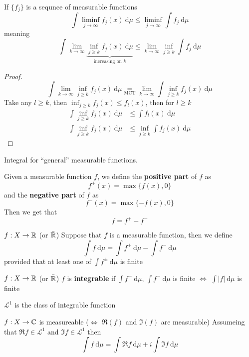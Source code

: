 \begin{lemma}
  If $\{f_j\}$ is a sequnce of measurable functions
  \[\int\liminf_{j\to\infty}f_j(x)\ \mathrm{d}\mu \le \liminf_{j\to\infty}\int f_j \ \mathrm{d}\mu\] 
  meaning 
  \[\int\lim_{k\to\infty} \underbrace{\inf_{j\ge k}f_j(x)\ \mathrm{d}\mu}_{\text{increasing on }k} \le \lim_{k\to\infty}\inf_{j\ge k}\int f_j \ \mathrm{d}\mu\] 
\end{lemma}
\begin{proof}
  \[\int\lim_{k\to\infty} \inf_{j\ge k}f_j(x)\ \mathrm{d}\mu \underset{\text{MCT}}= \lim_{k \to \infty} \int \inf_{j \ge k}f_j(x) \ \mathrm{d}\mu \]
  Take any $l \ge k$, then $\inf_{j \ge k}f_j(x) \le f_l(x)$, then for $l \ge k$
  \begin{align*}
    \int\inf_{j\ge k}f_j(x)\ \mathrm{d}\mu &\le \int f_l(x)\ \mathrm{d}\mu \\
    \int \inf_{j\ge k}f_j(x)\ \mathrm{d}\mu &\le \inf_{j\ge k}\int f_j(x)\ \mathrm{d}\mu
  \end{align*}
\end{proof}

Integral for ``general'' measurable functions.

\begin{definition}
  Given a measurable function $f$, we define the \textbf{positive part} of $f$ as 
  \[f^+(x) = \max\{f(x), 0\}\]
  and the \textbf{negative part} of $f$ as
  \[f^-(x) = \max\{-f(x), 0\}\]
  Then we get that 
  \[f = f^+ - f^-\]
\end{definition}

\begin{definition}
  $f: X \to \mathbb R$ (or $\bar{\mathbb R}$)
  Suppose that $f$ is a measurable function, then we define
  \[\int f \ \mathrm{d}\mu = \int f^+\ \mathrm{d}\mu - \int f^-\ \mathrm{d}\mu\]
  provided that at least one of $\int f^\pm \ \mathrm{d}\mu$ is finite
\end{definition}
\begin{definition}
  $f: X \to \mathbb R$ (or $\bar{\mathbb R}$)
  $f$ is \textbf{integrable} if $\int f^+ \ \mathrm{d}\mu$, $\int f^- \ \mathrm{d}\mu$ is finite
  $\iff$ $\int |f| \ \mathrm{d}\mu$ is finite

  $\mathcal{L}^1$ is the class of integrable function
\end{definition}

\begin{definition}
$f: X \to \mathbb C$ is measureable ($\iff$ $\Re(f)$ and $\Im(f)$ are measurable)
Assumeing that $\Re f \in \mathcal{L}^1$ and $\Im f \in \mathcal{L}^1$ then
\[\int f\ \mathrm{d}\mu = \int \Re f \ \mathrm{d}\mu + i \int \Im f \ \mathrm{d}\mu\]
\end{definition}

